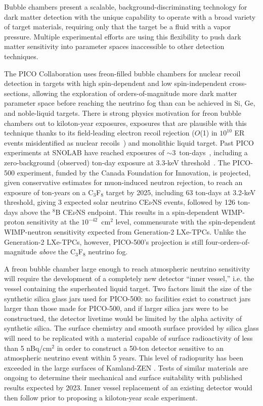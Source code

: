 Bubble chambers present a scalable, background-discriminating technology for dark matter detection with the unique capability to operate with a broad variety of target materials, requiring only that the target be a fluid with a vapor pressure.  Multiple experimental efforts are using this flexibility to push dark matter sensitivity into parameter spaces inaccessible to other detection techniques.

The PICO Collaboration uses freon-filled bubble chambers for nuclear recoil detection in targets with high spin-dependent and low spin-independent cross-sections, allowing the exploration of orders-of-magnitude more dark matter parameter space before reaching the neutrino fog than can be achieved in Si, Ge, and noble-liquid targets.  There is strong physics motivation for freon bubble chambers out to kiloton-year exposures, exposures that are plausible with this technique thanks to its field-leading electron recoil rejection ($O$(1) in $10^{10}$ ER events misidentified as nuclear recoils~\cite{PICO:2019rsv}) and monolithic liquid target.  Past PICO experiments at SNOLAB have reached exposures of $\sim$3~ton-days~\cite{PICO:2019vsc}, including a zero-background (observed) ton-day exposure at 3.3-keV threshold~\cite{PICO:2017tgi}.  The PICO-500 experiment, funded by the Canada Foundation for Innovation, is projected, given conservative estimates for muon-induced neutron rejection, to reach an exposure of  ton-years on a C$_3$F$_8$ target by 2025, including 63 ton-days at 3.2-keV threshold, giving 3 expected solar neutrino CE$\nu$NS events, followed by 126 ton-days above the $^8$B CE$\nu$NS endpoint.  This results in a spin-dependent WIMP-proton sensitivity at the $10^{-42}$~cm$^2$ level, commensurate with the spin-dependent WIMP-neutron sensitivity expected from Generation-2 LXe-TPCs.  Unlike the Generation-2 LXe-TPCs, however, PICO-500's projection is still four-orders-of-magnitude \emph{above} the C$_3$F$_8$ neutrino fog.

A freon bubble chamber large enough to reach atmospheric neutrino sensitivity will require the development of a completely new detector ``inner vessel,'' i.e. the vessel containing the superheated liquid target.  Two factors limit the size of the synthetic silica glass jars used for PICO-500: no facilities exist to construct jars larger than those made for PICO-500, and if larger silica jars were to be constructued, the detector livetime would be limited by the alpha activity of synthetic silica.  The surface chemistry and smooth surface provided by silica glass will need to be replicated with a material capable of surface radioactivity of less than 5 nBq/cm$^2$ in order to construct a 50-ton detector sensitive to an atmospheric neutrino event within 5 years.  This level of radiopurity has been exceeded in the large surfaces of Kamland-ZEN \cite{Gando:2020ggh}.  Tests of similar materials are ongoing to determine their mechanical and surface suitability with published results expected by 2023.  Inner vessel replacement of an existing detector would then follow prior to proposing a kiloton-year scale experiment.
